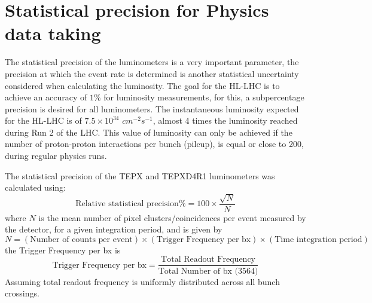 \section{Statistical precision for Physics data taking}
The statistical precision of the luminometers is a very important parameter, the precision at which the event rate is determined is another statistical uncertainty considered when calculating the luminosity. The goal for the HL-LHC is to achieve an accuracy of $1\%$ for luminosity measurements, for this, a subpercentage precision is desired for all luminometers. The instantaneous luminosity  expected for the HL-LHC is of $7.5\times10^{34}$ $cm^{-2}s^{-1}$, almost 4 times the luminosity reached during Run 2 of the LHC. This value of luminosity can only be achieved if the number of proton-proton interactions per bunch (pileup), is equal or close to 200, during regular physics runs. 

The statistical precision of the TEPX and TEPXD4R1 luminometers was calculated using:
\begin{equation}
\text {Relative statistical precision} \%=100\times \frac{\sqrt{N}}{N}
\label{statpr}
\end{equation} 
where $N$ is the mean number of pixel clusters/coincidences per event measured by the detector, for a given integration period, and is given by 
\begin{equation}
N=(\text {Number of counts per event})\times(\text {Trigger Frequency per bx})\times(\text {Time integration period})
\label{N01}
\end{equation}
 the Trigger Frequency per bx is 
\begin{equation}
\text {Trigger Frequency per bx}= \frac{\text {Total Readout Frequency}}{\text {Total Number of bx (3564)}}
\label{tfb}
\end{equation}
Assuming total readout frequency is uniformly distributed across all bunch crossings.

